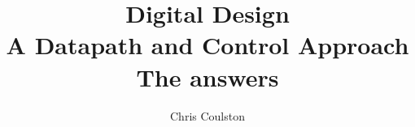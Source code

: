 \documentclass[11pt,psfig]{book}
\begin{document}
\newcommand{\bs}{\backslash}
\newcommand{\SOPmin}{${\rm SOP}_{\rm min} \ $}
\newcommand{\POSmin}{${\rm POS}_{\rm min} \ $}
\newcommand{\Tplh}{${\rm T}_{\rm plh} \ $}
\newcommand{\Tphl}{${\rm T}_{\rm phl} \ $}
\newcommand{\mod}{\rm mod}
\newenvironment{solution}[1]{\it  #1}{}


\title{{\Huge Digital Design} \\
A Datapath and Control Approach \\
{\small The answers}}
\author{Chris Coulston}
\date{}
\maketitle

\chapter{}	
\chapter{}	
\chapter{}	
\chapter{}	
\chapter{}	
\chapter{}	
\chapter{}	
\chapter{}	
\chapter{}	
\end{document}
